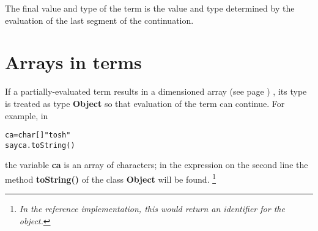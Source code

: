 The final value and type of the term is the value and type determined by
the evaluation of the last segment of the continuation.
\section{Arrays in terms}\label{refsarrayp}
 
If a partially-evaluated term results in a dimensioned
 array (see page \pageref{refarray}) , its type is treated as type
\textbf{Object} so that evaluation of the term can continue.  For
example, in
\begin{alltt}
ca=char[] "tosh"
say ca.toString()
\end{alltt}
the variable \textbf{ca} is an array of characters; in the expression
on the second line the method \textbf{toString()} of the
class \textbf{Object} will be found.
\footnote{
\emph{In the reference implementation, this would return an identifier
for the object.}
}
